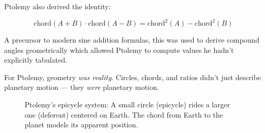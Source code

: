 Ptolemy also derived the identity:

\[
\text{chord}(A + B) \cdot \text{chord}(A - B) = \text{chord}^2(A) - \text{chord}^2(B)
\]

A precursor to modern sine addition formulas, this was used to derive compound angles geometrically which allowed Ptolemy to compute values he hadn't explicitly tabulated.

For Ptolemy, geometry \textit{was reality}. Circles, chords, and ratios didn’t just describe planetary motion — they \textit{were} planetary motion.


\begin{figure}[H]
    \centering
    \caption{Ptolemy’s epicycle system: A small circle (epicycle) rides a larger one (deferent) centered on Earth. The chord from Earth to the planet models its apparent position.}
\end{figure}
